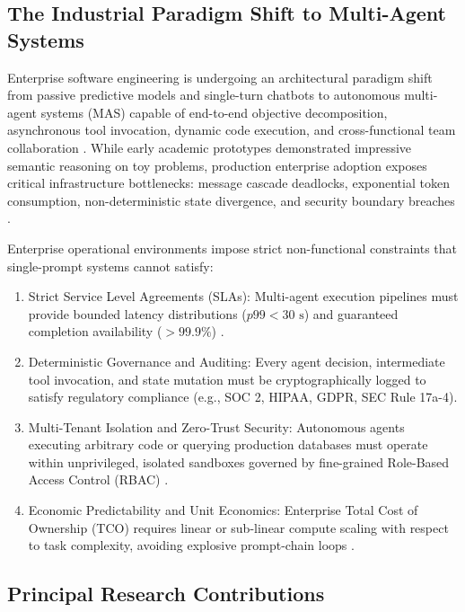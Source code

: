 \documentclass{article}
\begin{document}
\subsection{The Industrial Paradigm Shift to Multi-Agent Systems}


Enterprise software engineering is undergoing an architectural paradigm shift from passive predictive models and single-turn chatbots to autonomous multi-agent systems (MAS) capable of end-to-end objective decomposition, asynchronous tool invocation, dynamic code execution, and cross-functional team collaboration \cite{arxiv_2405_01543,arxiv_2005_14165}. While early academic prototypes demonstrated impressive semantic reasoning on toy problems, production enterprise adoption exposes critical infrastructure bottlenecks: message cascade deadlocks, exponential token consumption, non-deterministic state divergence, and security boundary breaches \cite{arxiv_2404_04289,crossref_10_1016_j_aei_2026_104392}.

Enterprise operational environments impose strict non-functional constraints that single-prompt systems cannot satisfy:
\begin{enumerate}
  \item Strict Service Level Agreements (SLAs): Multi-agent execution pipelines must provide bounded latency distributions ($p99 < 30\text{ s}$) and guaranteed completion availability ($>99.9\%$) \cite{crossref_10_1108_jeim_12_2025_1269}.
  \item Deterministic Governance and Auditing: Every agent decision, intermediate tool invocation, and state mutation must be cryptographically logged to satisfy regulatory compliance (e.g., SOC 2, HIPAA, GDPR, SEC Rule 17a-4).
  \item Multi-Tenant Isolation and Zero-Trust Security: Autonomous agents executing arbitrary code or querying production databases must operate within unprivileged, isolated sandboxes governed by fine-grained Role-Based Access Control (RBAC) \cite{arxiv_2404_04289,doaj_001772c2113c476d9d5d40452c8e10e1}.
  \item Economic Predictability and Unit Economics: Enterprise Total Cost of Ownership (TCO) requires linear or sub-linear compute scaling with respect to task complexity, avoiding explosive prompt-chain loops \cite{arxiv_2406_00584}.
\end{enumerate}


\subsection{Principal Research Contributions}
\end{document}

